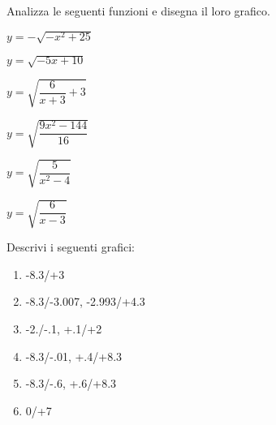 \begin{esercizio}\label{ese:stufun.4e}
Analizza le seguenti funzioni e disegna il loro grafico.
\begin{multicols}{3}
 \begin{enumeratea}
  \item \(y = -\sqrt{-x^2 +25}\) \\ [.8em]%
  \item \(y = \sqrt{-5x +10}\) %
  \item \(y = \sqrt{\dfrac{6}{x +3}+3}\) \\ %
  \item \(y = \sqrt{\dfrac{9x^2 -144}{16}}\) %
  \item \(y = \sqrt{\dfrac{5}{x^2 -4}}\) \\%
  \item \(y = \sqrt{\dfrac{6}{x -3}}\) %
 \end{enumeratea}
\end{multicols}
\end{esercizio}

\bigskip

\begin{esercizio}\label{ese:stufun.5g}
Descrivi i seguenti grafici:
\begin{multicols}{2}
 \begin{enumerate} [left=0pt, label=\alph*)]
  \item \myp 
{}
{-8.3/+3} %
  \item \myp 
{} 
{-8.3/-3.007, -2.993/+4.3} %
  \item \myp 
{} 
{-2./-.1, +.1/+2} %
\vspace{1mm}
  \item \myp 
{}
{-8.3/-.01, +.4/+8.3} %
  \item \myp 
{}
{-8.3/-.6, +.6/+8.3} %
  \item \myp 
{}
{0/+7} %
 \end{enumerate}
\end{multicols}
\end{esercizio}

